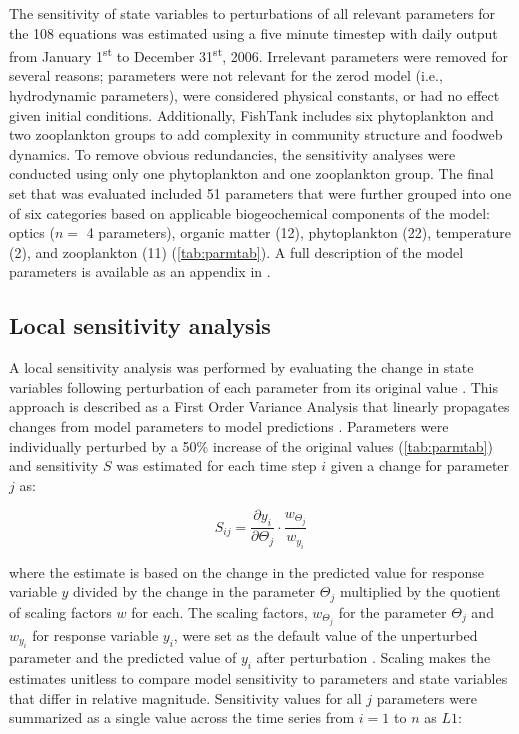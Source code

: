 \documentclass[review]{elsarticle}\usepackage[]{graphicx}\usepackage[]{color}
\begin{document}
The sensitivity of state variables to perturbations of all relevant parameters for the 108 equations was estimated using a five minute timestep with daily output from January 1\textsuperscript{st} to December 31\textsuperscript{st}, 2006. Irrelevant parameters were removed for several reasons; parameters were not relevant for the \ac{zerod} model (i.e., hydrodynamic parameters), were considered physical constants, or had no effect given initial conditions.  Additionally, FishTank includes six phytoplankton and two zooplankton groups to add complexity in community structure and foodweb dynamics. To remove obvious redundancies, the sensitivity analyses were conducted using only one phytoplankton and one zooplankton group.  The final set that was evaluated included 51 parameters that were further grouped into one of six categories based on applicable biogeochemical components of the model: optics ($n = $ 4 parameters), organic matter (12), phytoplankton (22), temperature (2), and zooplankton (11) (\cref{tab:parmtab}).  A full description of the model parameters is available as an appendix in \citet{Lehrter17}.  

\subsection{Local sensitivity analysis}

A local sensitivity analysis was performed by evaluating the change in state variables following perturbation of each parameter from its original value \citep{Soetaert10,Camacho14b,RDCT17}. This approach is described as a First Order Variance Analysis that linearly propagates changes from model parameters to model predictions \citep{Camacho14b}. Parameters were individually perturbed by a 50\% increase of the original values (\cref{tab:parmtab}) and sensitivity $S$ was estimated for each time step $i$ given a change for parameter $j$ as:

\begin{equation} \label{sijeqn}
S_{ij} = \frac{\partial y_i}{\partial \Theta_j}\cdot\frac{w_{\Theta_j}}{w_{y_i}}
\end{equation}

\noindent where the estimate is based on the change in the predicted value for response variable $y$ divided by the change in the parameter $\Theta_j$ multiplied by the quotient of scaling factors $w$ for each.  The scaling factors, $w_{\Theta_j}$ for the parameter $\Theta_j$ and $w_{y_i}$ for response variable $y_i$, were set as the default value of the unperturbed parameter and the predicted value of $y_i$ after perturbation \citep{Soetaert10}.  Scaling makes the estimates unitless to compare model sensitivity to parameters and state variables that differ in relative magnitude.  Sensitivity values for all $j$ parameters were summarized as a single value across the time series from $i = 1$ to $n$ as $L1$:
\end{document}
